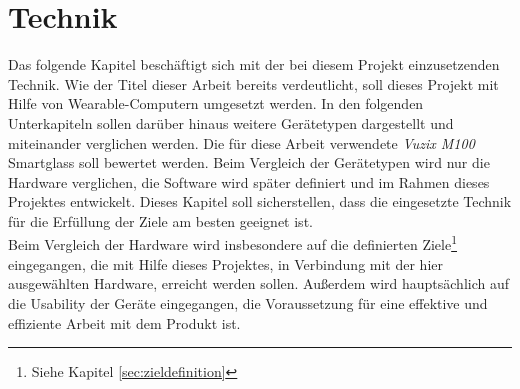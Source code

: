 \chapter{Technik}
\label{cha:technik}
Das folgende Kapitel beschäftigt sich mit der bei diesem Projekt einzusetzenden Technik. Wie der Titel dieser Arbeit bereits verdeutlicht, soll dieses Projekt mit Hilfe von Wearable-Computern umgesetzt werden. In den folgenden Unterkapiteln sollen darüber hinaus weitere Gerätetypen dargestellt und miteinander verglichen werden. Die für diese Arbeit verwendete \emph{Vuzix M100} Smartglass soll bewertet werden. Beim Vergleich der Gerätetypen wird nur die Hardware verglichen, die Software wird später definiert und im Rahmen dieses Projektes entwickelt. Dieses Kapitel soll sicherstellen, dass die eingesetzte Technik für die Erfüllung der Ziele am besten geeignet ist.\\

Beim Vergleich der Hardware wird insbesondere auf die definierten Ziele\footnote{Siehe Kapitel \ref{sec:zieldefinition} } eingegangen, die mit Hilfe dieses Projektes, in Verbindung mit der hier ausgewählten Hardware, erreicht werden sollen. Außerdem wird hauptsächlich auf die Usability der Geräte eingegangen, die Voraussetzung für eine effektive und effiziente Arbeit mit dem Produkt ist. 

